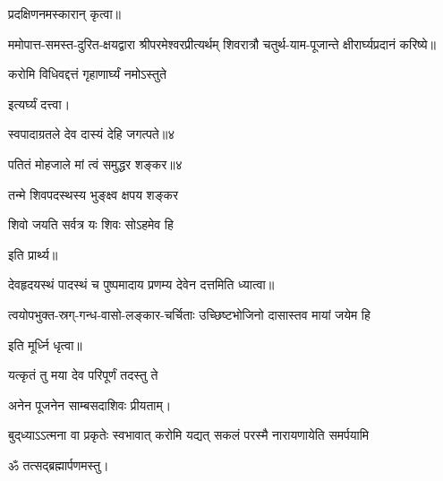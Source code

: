 प्रदक्षिणनमस्कारान् कृत्वा॥



ममोपात्त-समस्त-दुरित-क्षयद्वारा श्रीपरमेश्वरप्रीत्यर्थम् शिवरात्रौ चतुर्थ-याम-पूजान्ते क्षीरार्घ्यप्रदानं करिष्ये॥

{करोमि विधिवद्दत्तं गृहाणार्घ्यं नमोऽस्तुते}

इत्यर्घ्यं दत्त्वा।
\medskip


{स्वपादाग्रतले देव दास्यं देहि जगत्पते॥४}



{पतितं मोहजाले मां त्वं समुद्धर शङ्कर॥४}

{तन्मे शिवपदस्थस्य भुङ्क्ष्व क्षपय शङ्कर}

{शिवो जयति सर्वत्र यः शिवः सोऽहमेव हि}

इति प्रार्थ्य॥

 देवहृदयस्थं पादस्थं च पुष्पमादाय प्रणम्य देवेन दत्तमिति ध्यात्वा॥

{त्वयोपभुक्त-स्रग्-गन्ध-वासो-लङ्कार-चर्चिताः}
{उच्छिष्टभोजिनो दासास्तव मायां जयेम हि}

इति मूर्ध्नि धृत्वा॥

{यत्कृतं तु मया देव परिपूर्णं तदस्तु ते}


अनेन पूजनेन साम्बसदाशिवः प्रीयताम्। 

{बुद्‌ध्याऽऽत्मना वा प्रकृतेः स्वभावात्}
{करोमि यद्यत् सकलं परस्मै}
{नारायणायेति समर्पयामि}


ॐ तत्सद्ब्रह्मार्पणमस्तु।\medskip
